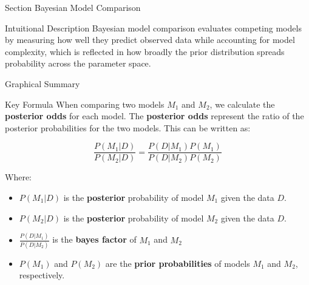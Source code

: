 
\begin{frame}{Section}
\centering
\Huge{Bayesian Model Comparison}
\end{frame}


\begin{frame}{Intuitional Description}
Bayesian model comparison evaluates competing models by measuring how well they predict observed data while accounting for model complexity, which is reflected in how broadly the prior distribution spreads probability across the parameter space.
\end{frame}

\begin{frame}{Graphical Summary}

\end{frame}


\begin{frame}{Key Formula}
When comparing two models $M_1$ and $M_2$, we calculate the \textbf{posterior odds} for each model. The \textbf{posterior odds} represent the ratio of the posterior probabilities for the two models. This can be written as:

$$
\frac{P(M_1|D)}{P(M_2|D)} = \frac{P(D|M_1)P(M_1)}{P(D|M_2)P(M_2)}
$$

Where:
\begin{itemize}
\item $P(M_1|D)$ is the \textbf{posterior} probability of model $M_1$ given the data $D$.
\item $P(M_2|D)$ is the \textbf{posterior} probability of model $M_2$ given the data $D$.
\item $\frac{P(D|M_1)}{P(D|M_2)}$ is the \textbf{bayes factor} of $M_1$ and $M_2$
\item $P(M_1)$ and $P(M_2)$ are the \textbf{prior probabilities} of models $M_1$ and $M_2$, respectively.
\end{itemize}

\end{frame}



